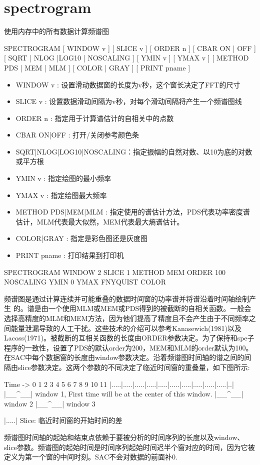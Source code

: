 \section{spectrogram}
\label{cmd:spectrogram}

使用内存中的所有数据计算频谱图

SPECTROGRAM [ WINDOW v ] [ SLICE v ] [ ORDER n ] [ CBAR ON | OFF ] [ SQRT | NLOG |LOG10 | NOSCALING ] [ YMIN v ] [ YMAX v ] [ METHOD PDS | MEM | MLM ] [
COLOR | GRAY ] [ PRINT pname ]

\begin{itemize}
\item WINDOW v : 设置滑动数据窗的长度为v秒，这个窗长决定了FFT的尺寸 
\item SLICE v : 设置数据滑动间隔为v秒，对每个滑动间隔将产生一个频谱图线 
\item ORDER n : 指定用于计算谱估计的自相关中的点数 
\item CBAR ON|OFF : 打开/关闭参考颜色条 
\item SQRT|NLOG|LOG10|NOSCALING：指定振幅的自然对数、以10为底的对数或平方根
\item YMIN v : 指定绘图的最小频率  
\item YMAX v : 指定绘图最大频率 
\item METHOD PDS|MEM|MLM : 指定使用的谱估计方法，PDS代表功率密度谱估计，MLM代表最大似然，MEM代表最大熵谱估计。  
\item COLOR|GRAY : 指定是彩色图还是灰度图 
\item PRINT pname : 打印结果到打印机  
\end{itemize}

SPECTROGRAM WINDOW 2 SLICE 1 METHOD MEM ORDER 100 NOSCALING 	YMIN 0 YMAX FNYQUIST COLOR

频谱图是通过计算连续并可能重叠的数据时间窗的功率谱并将谱沿着时间轴绘制产生	的。谱是由一个使用MLM或MEM或PDS得到的被截断的自相关函数。一般会选择高精度的MLM和MEM方法，因为他们提高了精度且不会产生由于不同频率之间能量泄漏导致的人工干扰。这些技术的介绍可以参考Kanasewich(1981)以及Lacoss(1971)。被截断的互相关函数的长度由ORDER参数决定。为了保持和spe子程序的一致性，设置了PDS的默认order为200，MEM和MLM的order默认为100。在SAC中每个数据窗的长度由window参数决定。沿着频谱图时间轴的谱之间的间隔由slice参数决定。这两个参数的不同决定了临近时间窗的重叠量，如下图所示:
\begin{SACCode}
Time ->
0  1  2  3  4  5  6  7  8  9 10 11
|.....|.....|.....|.....|.....|.....|.....|.....|.....|.....|..|
|__^__| window 1, First time will be at the center of this window.
      |__^__| window 2
            |__^__| window 3

|.....| Slice: 临近时间窗的开始时间的差
\end{SACCode}
频谱图时间轴的起始和结束点依赖于要被分析的时间序列的长度以及window、slice参数。频谱图的起始时间是时间序列起始时间迟半个窗对应的时间，因为它被定义为第一个窗的中间时刻。SAC不会对数据的前面补0.

